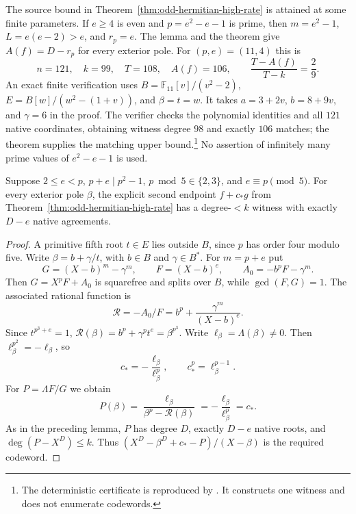 The source bound in Theorem~\ref{thm:odd-hermitian-high-rate} is
attained at some finite parameters. If $e\ge4$ is even and
$p=e^2-e-1$ is prime, then $m=e^2-1$, $L=e(e-2)>e$, and $r_p=e$.
The lemma and the theorem give $A(f)=D-r_p$ for every exterior pole.
For $(p,e)=(11,4)$ this is
\[
 n=121,\quad k=99,\quad T=108,\quad A(f)=106,\qquad
 \frac{T-A(f)}{T-k}=\frac29.
\]
An exact finite verification uses
$B=\mathbb F_{11}[v]/(v^2-2)$,
$E=B[w]/(w^2-(1+v))$, and $\beta=t=w$.
It takes $a=3+2v$, $b=8+9v$, and $\gamma=6$ in the proof.
The verifier checks the polynomial identities and all $121$ native
coordinates, obtaining witness degree $98$ and exactly $106$ matches;
the theorem supplies the matching upper bound.\footnote{The deterministic
certificate is reproduced by
.
It constructs one witness and does not enumerate codewords.}
No assertion of infinitely many prime values of $e^2-e-1$ is used.

\begin{lemma}
\label{lem:hermitian-cstar-endpoint-competitor}
Suppose $2\le e<p$, $p+e\mid p^2-1$,
$p\bmod5\in\{2,3\}$, and $e\equiv p\pmod5$.
For every exterior pole $\beta$, the explicit second endpoint
$f+c_*g$ from Theorem~\ref{thm:odd-hermitian-high-rate} has a
degree-$<k$ witness with exactly $D-e$ native agreements.
\end{lemma}
\begin{proof}
A primitive fifth root $t\in E$ lies outside $B$, since $p$ has
order four modulo five. Write $\beta=b+\gamma/t$, with
$b\in B$ and $\gamma\in B^*$. For $m=p+e$ put
\[
 G=(X-b)^m-\gamma^m,\qquad F=(X-b)^e,\qquad
 A_0=-b^pF-\gamma^m.
\]
Then $G=X^pF+A_0$ is squarefree and splits over $B$, while
$\gcd(F,G)=1$. The associated rational function is
\[
 \mathcal R=-A_0/F=b^p+\frac{\gamma^m}{(X-b)^e}.
\]
Since $t^{p^3+e}=1$,
$\mathcal R(\beta)=b^p+\gamma^pt^e=\beta^{p^3}$.
Write $\ell_\beta=\Lambda(\beta)\ne0$. Then
$\ell_\beta^{p^2}=-\ell_\beta$, so
\[
 c_*=-\frac{\ell_\beta}{\ell_\beta^p},
 \qquad c_*^p=\ell_\beta^{p-1}.
\]
For $P=\Lambda F/G$ we obtain
\[
 P(\beta)=
 \frac{\ell_\beta}{\beta^p-\mathcal R(\beta)}
 =-\frac{\ell_\beta}{\ell_\beta^p}=c_*.
\]
As in the preceding lemma, $P$ has degree $D$, exactly $D-e$
native roots, and $\deg(P-X^D)\le k$. Thus
$(X^D-\beta^D+c_*-P)/(X-\beta)$ is the required codeword.
\end{proof}

